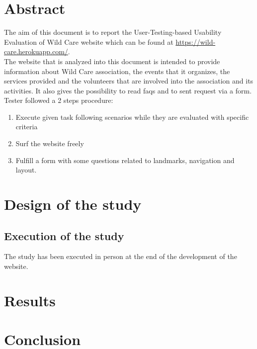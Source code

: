\documentclass[11pt, a4paperm, hidelinks]{article}
\begin{document}
	\section{Abstract}
	The aim of this document is to report the User-Testing-based Usability Evaluation of Wild Care website which can be found at 	\url{https://wild-care.herokuapp.com/}.	\\ The website that is analyzed into this document is intended to provide 				information about Wild Care association, the events that it organizes, the services provided and the volunteers that are 			involved into the association and its activities. It also gives the possibility to read faqs and to sent request via a form.\\
 	Tester followed a 2 steps procedure:
	\begin{enumerate}
		\item Execute given task following scenarios while they are evaluated with specific criteria
		\item Surf the website freely
		\item Fulfill a form with some questions related to landmarks, navigation and layout.
	\end{enumerate}	

	\section{Design of the study}
	


	\subsection{Execution of the study}
	The study has been executed in person at the end of the development of the website.


	\section{Results}
	
	\clearpage


	\section{Conclusion}	
	\clearpage
\end{document}
